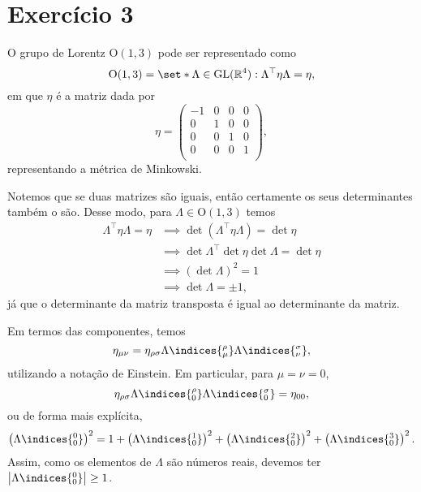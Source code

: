 \section*{Exercício 3}
O grupo de Lorentz \(\mathrm{O}(1,3)\) pode ser representado como \begin{equation*}
    \mathrm{O}(1,3) = \set*{\Lambda \in \mathrm{GL}(\mathbb{R}^4) : \Lambda^\top \eta \Lambda = \eta},
\end{equation*}
em que \(\eta\) é a matriz dada por
\begin{equation*}
    \eta = \begin{pmatrix}
        -1 & 0 & 0 & 0\\
        0 & 1 & 0 & 0\\
        0 & 0 & 1 & 0\\
        0 & 0 & 0 & 1\\
    \end{pmatrix},
\end{equation*}
representando a métrica de Minkowski.

Notemos que se duas matrizes são iguais, então certamente os seus determinantes também o são. Desse modo, para \(\Lambda \in \mathrm{O}(1,3)\) temos
\begin{align*}
    \Lambda^\top \eta \Lambda = \eta &\implies \det\left(\Lambda^\top \eta \Lambda\right) = \det \eta\\
                                     &\implies \det \Lambda^\top \det \eta \det \Lambda = \det \eta\\
                                     &\implies \left(\det \Lambda\right)^2 = 1\\
                                     &\implies \det \Lambda = \pm 1,
\end{align*}
já que o determinante da matriz transposta é igual ao determinante da matriz.

Em termos das componentes, temos
\begin{equation*}
    \eta_{\mu\nu} = \eta_{\rho\sigma}\Lambda\indices{^\rho_\mu}\Lambda\indices{^\sigma_\nu},
\end{equation*}
utilizando a notação de Einstein. Em particular, para \(\mu = \nu = 0\),
\begin{equation*}
    \eta_{\rho\sigma}\Lambda\indices{^\rho_0}\Lambda\indices{^\sigma_0} = \eta_{00},
\end{equation*}
ou de forma mais explícita,
\begin{equation*}
    \left(\Lambda\indices{^0_0}\right)^2 = 1 + \left(\Lambda\indices{^1_0}\right)^2+ \left(\Lambda\indices{^2_0}\right)^2+ \left(\Lambda\indices{^3_0}\right)^2.
\end{equation*}
Assim, como os elementos de \(\Lambda\) são números reais, devemos ter \(\left|\Lambda\indices{^0_0}\right| \geq 1\).

